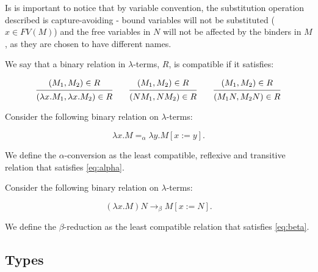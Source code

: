 \begin{remark}
	Is is important to notice that by variable convention, the substitution operation described is capture-avoiding - bound variables will not be substituted ($x \in FV(M)$) and the free variables in $N$ will not be affected by the binders in $M$, as they are chosen to have different names. 
\end{remark}

\begin{definition}
  We say that a binary relation in $\lambda$-terms, $R$, is compatible if it satisfies:

  \[
    \begin{prooftree}
      \hypo{ (M_1, M_2) \in R }
      \infer1{ (\lambda x . M_1, \lambda x . M_2) \in R } 
    \end{prooftree}
    \qquad
    \begin{prooftree}
      \hypo{ (M_1, M_2) \in R }
      \infer1{ (N M_1, N M_2) \in R } 
    \end{prooftree}
    \qquad
    \begin{prooftree}
      \hypo{ (M_1, M_2) \in R }
      \infer1{ (M_1 N, M_2 N) \in R } 
    \end{prooftree}
  \]
\end{definition}

\begin{definition}
	Consider the following binary relation on $\lambda$-terms:
	
	\[
		\lambda x . M =_\alpha \lambda y . M[x := y]. 
		\label{eq:alpha} \tag{$\alpha$}
	\]
	
	We define the $\alpha$-conversion as the least compatible, reflexive and transitive relation that satisfies \eqref{eq:alpha}.
\end{definition}

\begin{definition}
	Consider the following binary relation on $\lambda$-terms:
	
	\[
		(\lambda x . M) N \to_\beta M[x := N]. \label{eq:beta} \tag{$\beta$}
	\]
	
	We define the $\beta$-reduction as the least compatible relation that satisfies \eqref{eq:beta}.
\end{definition}


\subsection{Types}

